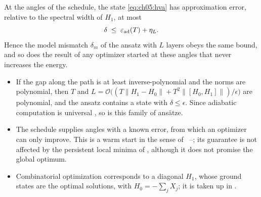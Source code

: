 \documentclass[handoutsbeamer.tex]{subfiles}
\begin{document}
\begin{frame}
\onp{\scriptsize}
\begin{propn}\label{propn:ch05:adiabatic}
At the angles of the schedule, the state \eqref{eq:ch05:hva} has approximation error, relative to the spectral width of $H_1$, at most
\begin{equation*}
    \delta \;\le\; \varepsilon_{\rm ad}(T) + \eta_L.
\end{equation*}
Hence the model mismatch $\delta_m$ of the ansatz with $L$ layers obeys the same bound, and so does the result of any optimizer started at these angles that never increases the energy.
\end{propn}
\begin{itemize}\setlength\itemsep{0.2em}
    \item If the gap along the path is at least inverse-polynomial and the norms are polynomial, then $T$ and $L = \mathcal O\big((T\|H_1-H_0\| + T^2\|[H_0,H_1]\|)/\epsilon\big)$ are polynomial, and the ansatz contains a state with $\delta\le\epsilon$. Since adiabatic computation is universal \citep{aharonov2007adiabatic}, so is this family of ans\"atze.
    \item The schedule supplies angles with a known error, from which an optimizer can only improve. This is a warm start in the sense of \Chaps~--; its guarantee is not affected by the persistent local minima of \citet{bittel2021training}, although it does not promise the global optimum.
    \item Combinatorial optimization corresponds to a diagonal $H_1$, whose ground states are the optimal solutions, with $H_0 = -\sum_jX_j$; it is taken up in .
\end{itemize}
\end{frame}
\end{document}
